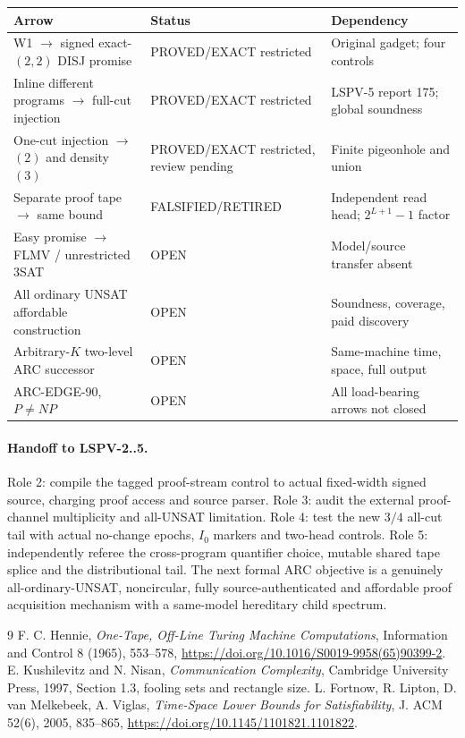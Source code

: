 \documentclass[11pt]{article}
\begin{document}
\begin{center}\small
\begin{tabularx}{.98\linewidth}{p{.39\linewidth}p{.20\linewidth}X}
\toprule
Arrow & Status & Dependency\\\midrule
W1 $\to$ signed exact-$(2,2)$ DISJ promise &
PROVED/EXACT restricted & Original gadget; four controls\\
Inline different programs $\to$ full-cut injection &
PROVED/EXACT restricted & LSPV-5 report 175; global soundness\\
One-cut injection $\to$ $(2)$ and density $(3)$ &
PROVED/EXACT restricted, review pending & Finite pigeonhole and union\\
Separate proof tape $\to$ same bound &
FALSIFIED/RETIRED & Independent read head; $2^{L+1}-1$ factor\\
Easy promise $\to$ FLMV / unrestricted 3SAT &
OPEN & Model/source transfer absent\\
All ordinary UNSAT affordable construction &
OPEN & Soundness, coverage, paid discovery\\
Arbitrary-$K$ two-level ARC successor &
OPEN & Same-machine time, space, full output\\
ARC-EDGE-90, $P\ne NP$ &
OPEN & All load-bearing arrows not closed\\\bottomrule
\end{tabularx}
\end{center}

\paragraph{Handoff to LSPV-2..5.}
Role 2: compile the tagged proof-stream control to
actual fixed-width signed source, charging proof
access and source parser. Role 3: audit the external
proof-channel multiplicity and all-UNSAT limitation.
Role 4: test the new $3/4$ all-cut tail with actual
no-change epochs, $I_0$ markers and two-head controls.
Role 5: independently referee the cross-program
quantifier choice, mutable shared tape splice and the
distributional tail. The next formal ARC objective is
a genuinely all-ordinary-UNSAT, noncircular, fully
source-authenticated and affordable proof acquisition
mechanism with a same-model hereditary child spectrum.

\begin{thebibliography}{9}
 F. C. Hennie, \emph{One-Tape, Off-Line Turing
Machine Computations}, Information and Control 8 (1965),
553--578, \url{https://doi.org/10.1016/S0019-9958(65)90399-2}.
 E. Kushilevitz and N. Nisan,
\emph{Communication Complexity}, Cambridge University Press,
1997, Section 1.3, fooling sets and rectangle size.
 L. Fortnow, R. Lipton, D. van Melkebeek,
A. Viglas, \emph{Time-Space Lower Bounds for Satisfiability},
J. ACM 52(6), 2005, 835--865,
\url{https://doi.org/10.1145/1101821.1101822}.
\end{thebibliography}
\end{document}
